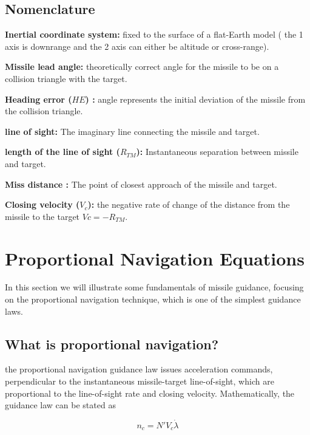 \subsection*{Nomenclature}

\textbf{Inertial coordinate system:} fixed to the surface of a flat-Earth model ( the 1 axis is downrange and the 2 axis can either be altitude or cross-range).

\textbf{Missile lead angle:} theoretically correct angle
for the missile to be on a collision triangle with the target.

\textbf{Heading error ($HE$) :} angle represents the initial deviation of the missile from the collision triangle.

\textbf{line of sight:} The imaginary line connecting the missile and target.

\textbf{length of the line of sight ($R_{TM}$):} Instantaneous separation between missile and target.

\textbf{Miss distance :} The point of closest approach of the missile and target.

\textbf{Closing velocity ($V_c$):} the negative rate of change of the distance
from the missile to the target $Vc= -R_{TM} $.




\section{Proportional Navigation Equations}
In this section we will illustrate some fundamentals of missile guidance, focusing on the proportional navigation technique, which is one of the simplest guidance laws.

\subsection*{What is proportional navigation?}
the proportional navigation guidance law issues acceleration commands,
perpendicular to the instantaneous missile-target line-of-sight, which are
proportional to the line-of-sight rate and closing velocity. Mathematically, the
guidance law can be stated as

\begin{equation}
	n_c= N' V_c \dot{\lambda}
\end{equation}

